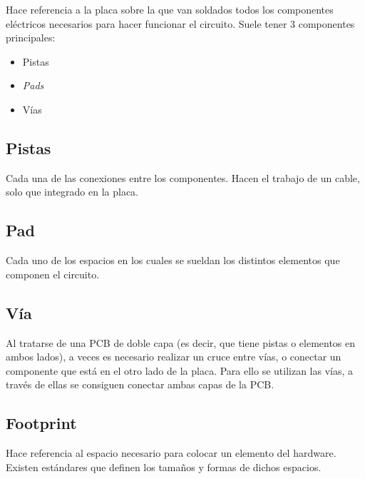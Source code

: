 Hace referencia a la placa sobre la que van soldados todos los componentes eléctricos necesarios para hacer funcionar el circuito. Suele tener 3 componentes principales:

\begin{itemize}
\item
Pistas
\item
\emph{Pads}
\item
Vías
\end{itemize}

\subsection{Pistas}\label{pistas}

Cada una de las conexiones entre los componentes. Hacen el trabajo de un cable, solo que integrado en la placa.


\subsection{Pad}\label{pad}

Cada uno de los espacios en los cuales se sueldan los distintos  elementos que componen el circuito.


\subsection{Vía}\label{via}

Al tratarse de una PCB de doble capa (es decir, que tiene pistas o elementos en ambos lados), a veces es necesario realizar un cruce entre vías, o conectar un componente que está en el otro lado de la placa. Para ello se utilizan las vías, a través de ellas se consiguen conectar ambas capas de la PCB.


\subsection{Footprint}\label{footprint}

Hace referencia al espacio necesario para colocar un elemento del hardware. Existen estándares que definen los tamaños y formas de dichos espacios.


